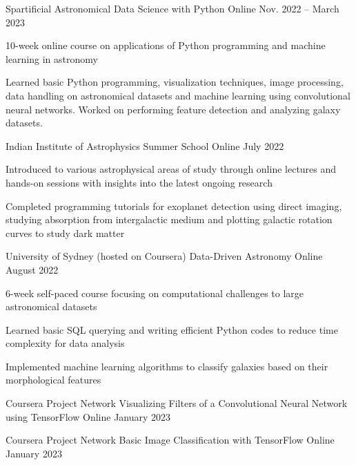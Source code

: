\begin{cventries}
    \cventry
    {Spartificial} %
    {Astronomical Data Science with Python} %
    {Online} %
    {Nov. 2022 -- March 2023} %
    {
        \begin{cvitems}
        \item 10-week online course on applications of Python programming and machine learning in astronomy
        \item Learned basic Python programming, visualization techniques, image processing, data handling on astronomical datasets and machine learning using convolutional neural networks. Worked on performing feature detection and analyzing galaxy datasets.
        \end{cvitems}
    }

    \cventry
    {Indian Institute of Astrophysics} %
    {Summer School} %
    {Online} %
    {July 2022} %
    {
        \begin{cvitems}
        \item Introduced to various astrophysical areas of study through online lectures and hands-on sessions with insights into the latest ongoing research
        \item Completed programming tutorials for exoplanet detection using direct imaging, studying absorption from intergalactic medium and plotting galactic rotation curves to study dark matter
        \end{cvitems}
    }

    \cventry
    {University of Sydney (hosted on Coursera)} %
    {Data-Driven Astronomy} %
    {Online} %
    {August 2022} %
    {
        \begin{cvitems}
        \item 6-week self-paced course focusing on computational challenges to large astronomical datasets
        \item Learned basic SQL querying and writing efficient Python codes to reduce time complexity for data analysis
        \item Implemented machine learning algorithms to classify galaxies based on their morphological features
        \end{cvitems}
    }

    \cventry
    {Coursera Project Network} %
    {Visualizing Filters of a Convolutional Neural Network using TensorFlow} %
    {Online} %
    {January 2023} %
    {}

    \cventry
    {Coursera Project Network} %
    {Basic Image Classification with TensorFlow} %
    {Online} %
    {January 2023} %
    {}

\end{cventries}
